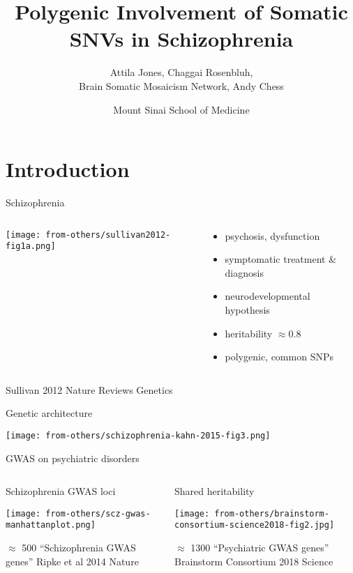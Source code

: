 \documentclass[usenames,dvipsnames]{beamer}
\title{Polygenic Involvement of Somatic SNVs in Schizophrenia}
\author{Attila Jones, Chaggai Rosenbluh,\\Brain Somatic Mosaicism Network, Andy Chess}
\date{Mount Sinai School of Medicine}
\begin{document}
\maketitle

\section{Introduction}

\begin{frame}{Schizophrenia}
\begin{columns}[t]
\begin{column}{0.4\textwidth}

\texttt{[image: from-others/sullivan2012-fig1a.png]}
\end{column}

\begin{column}{0.6\textwidth}
\begin{itemize}
\item psychosis, dysfunction
\item symptomatic treatment \& diagnosis
\item neurodevelopmental hypothesis
\item heritability \(\approx 0.8\)
\item polygenic, common SNPs
\end{itemize}
\end{column}
\end{columns}

{\tiny Sullivan 2012 Nature Reviews Genetics}
\end{frame}

\begin{frame}{Genetic architecture}
\begin{center}
\texttt{[image: from-others/schizophrenia-kahn-2015-fig3.png]}
\end{center}
\end{frame}

\begin{frame}[label=gwas]{GWAS on psychiatric disorders}

\begin{columns}[t]
\begin{column}{0.5\textwidth}
\begin{center}
Schizophrenia GWAS loci

\texttt{[image: from-others/scz-gwas-manhattanplot.png]}

\footnotesize
\(\approx\) 500 ``Schizophrenia GWAS genes''
{\tiny Ripke et al 2014 Nature}
\end{center}
\end{column}

\begin{column}{0.5\textwidth}
Shared heritability

\texttt{[image: from-others/brainstorm-consortium-science2018-fig2.jpg]}

\footnotesize
\(\approx\) 1300 ``Psychiatric GWAS genes''
{\tiny Brainstorm Consortium 2018 Science}
\end{column}
\end{columns}
\end{frame}
\end{document}
